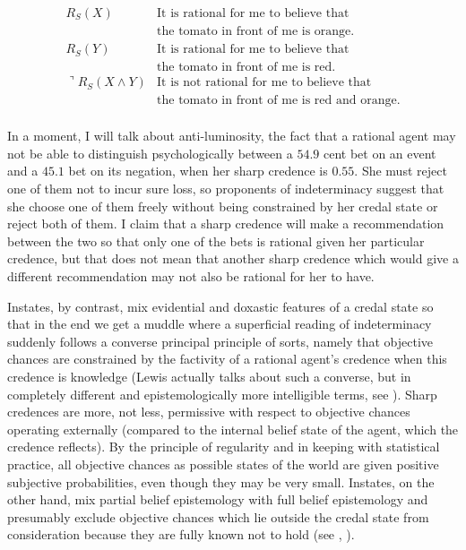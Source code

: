 \documentclass[11pt]{article}
\begin{document}
\begin{displaymath}
  \begin{array}{rl}
    R_{S}(X) & \mbox{It is rational for me to believe that} \\
        & \mbox{the tomato in front of me is orange.} \\
    R_{S}(Y) & \mbox{It is rational for me to believe that} \\
        & \mbox{the tomato in front of me is red.} \\
    \urcorner{}R_{S}(X\wedge{}Y) & \mbox{It is not rational for me to believe that} \\
        & \mbox{the tomato in front of me is red and orange.} \\
  \end{array}
\end{displaymath}

In a moment, I will talk about anti-luminosity, the fact that a
rational agent may not be able to distinguish psychologically between
a $54.9$ cent bet on an event and a $45.1$ bet on its negation, when
her sharp credence is $0.55$. She must reject one of them not to incur
sure loss, so proponents of indeterminacy suggest that she choose one
of them freely without being constrained by her credal state or reject
both of them. I claim that a sharp credence will make a recommendation
between the two so that only one of the bets is rational given her
particular credence, but that does not mean that another sharp
credence which would give a different recommendation may not also be
rational for her to have.

Instates, by contrast, mix evidential and doxastic features of a
credal state so that in the end we get a muddle where a superficial
reading of indeterminacy suddenly follows a converse principal
principle of sorts, namely that objective chances are constrained by
the factivity of a rational agent's credence when this credence is
knowledge (Lewis actually talks about such a converse, but in
completely different and epistemologically more intelligible terms,
see ). Sharp credences are more, not less,
permissive with respect to objective chances operating externally
(compared to the internal belief state of the agent, which the
credence reflects). By the principle of regularity and in keeping with
statistical practice, all objective chances as possible states of the
world are given positive subjective probabilities, even though they
may be very small. Instates, on the other hand, mix partial belief
epistemology with full belief epistemology and presumably exclude
objective chances which lie outside the credal state from
consideration because they are fully known not to hold (see
, ).
\end{document}
